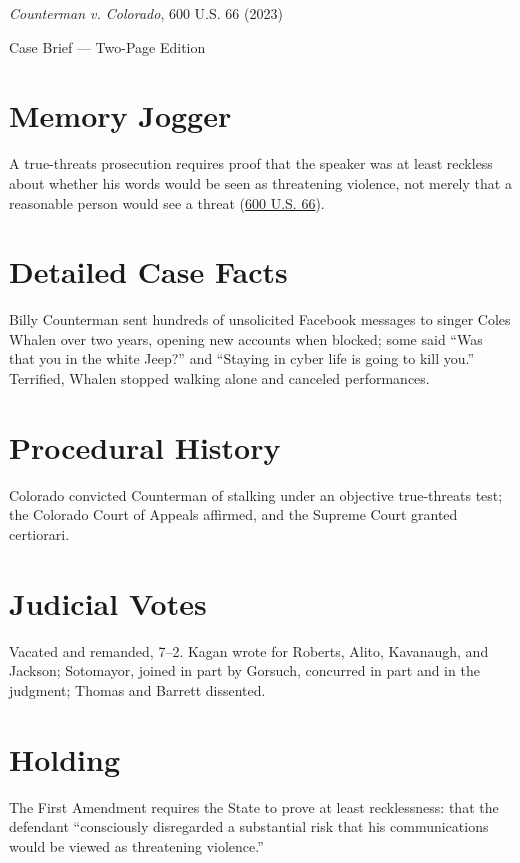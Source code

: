 \documentclass[12pt]{article}
\begin{document}
\begin{center}
{\LARGE \textit{Counterman v. Colorado}, 600 U.S. 66 (2023)\par}
\vspace{0.5em}
{\large Case Brief --- Two-Page Edition\par}
\end{center}

\section{Memory Jogger}
A true-threats prosecution requires proof that the speaker was at least reckless about whether his words would be seen as threatening violence, not merely that a reasonable person would see a threat (\href{https://supreme.justia.com/cases/federal/us/600/22-138/}{600 U.S. 66}).

\section{Detailed Case Facts}
Billy Counterman sent hundreds of unsolicited Facebook messages to singer Coles Whalen over two years, opening new accounts when blocked; some said ``Was that you in the white Jeep?'' and ``Staying in cyber life is going to kill you.'' Terrified, Whalen stopped walking alone and canceled performances.

\section{Procedural History}
Colorado convicted Counterman of stalking under an objective true-threats test; the Colorado Court of Appeals affirmed, and the Supreme Court granted certiorari.

\section{Judicial Votes}
Vacated and remanded, 7--2. Kagan wrote for Roberts, Alito, Kavanaugh, and Jackson; Sotomayor, joined in part by Gorsuch, concurred in part and in the judgment; Thomas and Barrett dissented.

\section{Holding}
The First Amendment requires the State to prove at least recklessness: that the defendant ``consciously disregarded a substantial risk that his communications would be viewed as threatening violence.''
\end{document}
